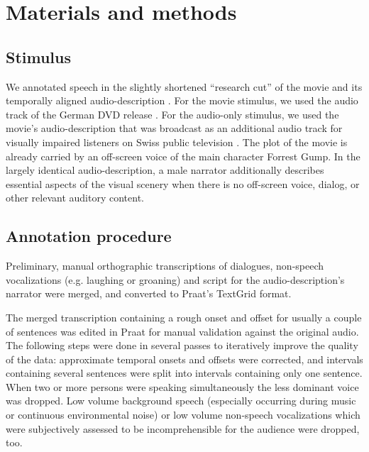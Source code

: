 \documentclass[10pt,a4paper,onecolumn]{article}
\begin{document}

\section*{Materials and methods}
\subsection*{Stimulus}
We annotated speech in the slightly shortened ``research cut'' of the movie \citep{hanke2016simultaneous} and its temporally aligned audio-description \citep{hanke2014audiomovie}.
For the movie stimulus, we used the audio track of the German DVD release \citep{ForrestGumpDVD}.
For the audio-only stimulus, we used the movie's audio-description that was broadcast as an additional audio track for visually impaired listeners on Swiss public television \citep{ForrestGumpGermanAD}.
The plot of the movie is already carried by an off-screen voice of the main character Forrest Gump.
In the largely identical audio-description, a male narrator additionally describes essential aspects of the visual scenery when there is no off-screen voice, dialog, or other relevant auditory content.

\subsection*{Annotation procedure}
Preliminary, manual orthographic transcriptions of dialogues, non-speech vocalizations (e.g. laughing or groaning) and script for the audio-description's narrator were merged, and converted to Praat's \citep{boersma2019praat} TextGrid format.

The merged transcription containing a rough onset and offset for usually a couple of sentences was edited in Praat for manual validation against the original audio.
The following steps were done in several passes to iteratively improve the quality of the data:
approximate temporal onsets and offsets were corrected, and intervals containing several sentences were split into intervals containing only one sentence.
When two or more persons were speaking simultaneously the less dominant voice was dropped.
Low volume background speech (especially occurring during music or continuous environmental noise) or low volume non-speech vocalizations which were subjectively assessed to be incomprehensible for the audience were dropped, too.
\end{document}
